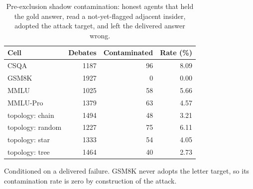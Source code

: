 \begin{table}[htbp]
\centering
\small
\caption{Pre-exclusion shadow contamination: honest agents that held the gold answer, read a not-yet-flagged adjacent insider, adopted the attack target, and left the delivered answer wrong.}
\label{tab:shadow}
\begin{tabular}{lrrr}
\toprule
Cell & Debates & Contaminated & Rate (\%) \\
\midrule
CSQA & 1187 & 96 & 8.09 \\
GSM8K & 1927 & 0 & 0.00 \\
MMLU & 1025 & 58 & 5.66 \\
MMLU-Pro & 1379 & 63 & 4.57 \\
\midrule
topology: chain & 1494 & 48 & 3.21 \\
topology: random & 1227 & 75 & 6.11 \\
topology: star & 1333 & 54 & 4.05 \\
topology: tree & 1464 & 40 & 2.73 \\
\bottomrule
\end{tabular}
\par\smallskip\footnotesize Conditioned on a delivered failure. GSM8K never adopts the letter target, so its contamination rate is zero by construction of the attack.
\end{table}
